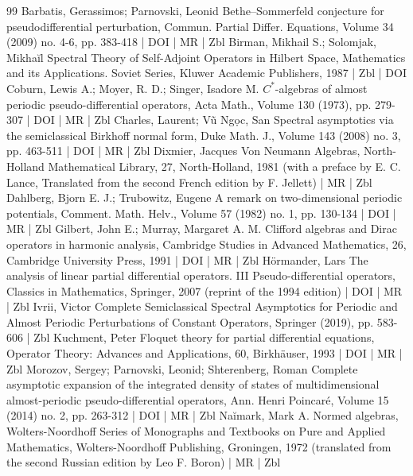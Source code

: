 \begin{thebibliography}{99}
Barbatis, Gerassimos; Parnovski, Leonid Bethe–Sommerfeld conjecture for pseudodifferential perturbation, Commun. Partial Differ. Equations, Volume 34 (2009) no. 4-6, pp. 383-418 | DOI | MR | Zbl
Birman, Mikhail S.; Solomjak, Mikhaĭl Spectral Theory of Self-Adjoint Operators in Hilbert Space, Mathematics and its Applications. Soviet Series, Kluwer Academic Publishers, 1987 | Zbl | DOI
Coburn, Lewis A.; Moyer, R. D.; Singer, Isadore M. ${C}^*$-algebras of almost periodic pseudo-differential operators, Acta Math., Volume 130 (1973), pp. 279-307 | DOI | MR | Zbl
Charles, Laurent; Vũ Ngọc, San Spectral asymptotics via the semiclassical Birkhoff normal form, Duke Math. J., Volume 143 (2008) no. 3, pp. 463-511 | DOI | MR | Zbl
Dixmier, Jacques Von Neumann Algebras, North-Holland Mathematical Library, 27, North-Holland, 1981 (with a preface by E. C. Lance, Translated from the second French edition by F. Jellett) | MR | Zbl
Dahlberg, Bjorn E. J.; Trubowitz, Eugene A remark on two-dimensional periodic potentials, Comment. Math. Helv., Volume 57 (1982) no. 1, pp. 130-134 | DOI | MR | Zbl
Gilbert, John E.; Murray, Margaret A. M. Clifford algebras and Dirac operators in harmonic analysis, Cambridge Studies in Advanced Mathematics, 26, Cambridge University Press, 1991 | DOI | MR | Zbl
Hörmander, Lars The analysis of linear partial differential operators. III Pseudo-differential operators, Classics in Mathematics, Springer, 2007 (reprint of the 1994 edition) | DOI | MR | Zbl
Ivrii, Victor Complete Semiclassical Spectral Asymptotics for Periodic and Almost Periodic Perturbations of Constant Operators, Springer (2019), pp. 583-606 | Zbl
Kuchment, Peter Floquet theory for partial differential equations, Operator Theory: Advances and Applications, 60, Birkhäuser, 1993 | DOI | MR | Zbl
Morozov, Sergey; Parnovski, Leonid; Shterenberg, Roman Complete asymptotic expansion of the integrated density of states of multidimensional almost-periodic pseudo-differential operators, Ann. Henri Poincaré, Volume 15 (2014) no. 2, pp. 263-312 | DOI | MR | Zbl
Naĭmark, Mark A. Normed algebras, Wolters-Noordhoff Series of Monographs and Textbooks on Pure and Applied Mathematics, Wolters-Noordhoff Publishing, Groningen, 1972 (translated from the second Russian edition by Leo F. Boron) | MR | Zbl

\end{thebibliography}
